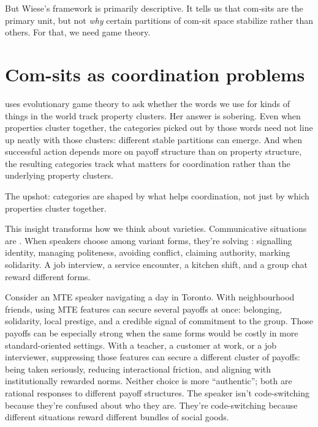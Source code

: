 \documentclass[11pt,letterpaper]{article}
\begin{document}
But Wiese's framework is primarily descriptive. It tells us that com-sits are the primary unit, but not \emph{why} certain partitions of com-sit space stabilize rather than others. For that, we need game theory.

\section{Com-sits as coordination problems}

\textcite{oconnor2019games} uses evolutionary game theory to ask whether the words we use for kinds of things in the world track property clusters. Her answer is sobering. Even when properties cluster together, the categories picked out by those words need not line up neatly with those clusters: different stable partitions can emerge. And when successful action depends more on payoff structure than on property structure, the resulting categories track what matters for coordination rather than the underlying property clusters.

The upshot: categories are shaped by what helps coordination, not just by which properties cluster together.

This insight transforms how we think about varieties. Communicative situations are . When speakers choose among variant forms, they're solving : signalling identity, managing politeness, avoiding conflict, claiming authority, marking solidarity. A job interview, a service encounter, a kitchen shift, and a group chat reward different forms.

Consider an MTE speaker navigating a day in Toronto. With neighbourhood friends, using MTE features can secure several payoffs at once: belonging, solidarity, local prestige, and a credible signal of commitment to the group. Those payoffs can be especially strong when the same forms would be costly in more standard-oriented settings. With a teacher, a customer at work, or a job interviewer, suppressing those features can secure a different cluster of payoffs: being taken seriously, reducing interactional friction, and aligning with institutionally rewarded norms. Neither choice is more \enquote{authentic}; both are rational responses to different payoff structures. The speaker isn't code-switching because they're confused about who they are. They're code-switching because different situations reward different bundles of social goods.
\end{document}
